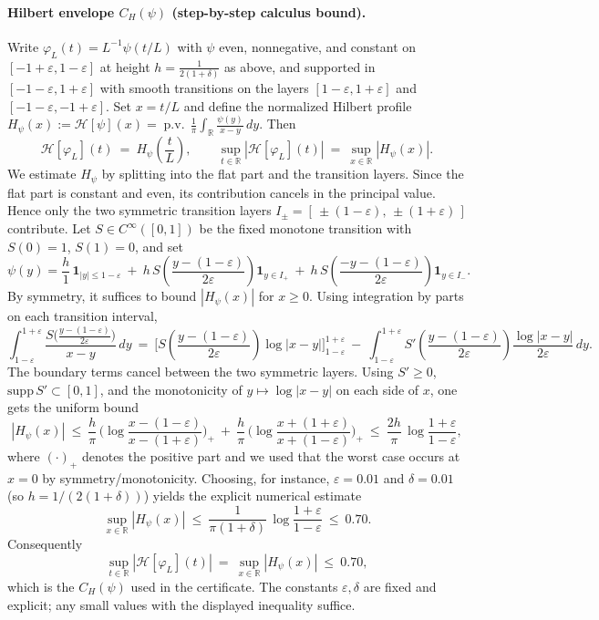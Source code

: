 \documentclass[11pt]{article}
\theoremstyle{definition}
\theoremstyle{remark}
\newcommand{\R}{\mathbb{R}}
\begin{document}
\paragraph{Hilbert envelope $C_H(\psi)$ (step-by-step calculus bound).}
Write $\varphi_L(t)=L^{-1}\psi(t/L)$ with $\psi$ even, nonnegative, and constant on $[-1+\varepsilon,1-\varepsilon]$ at height $h=\tfrac{1}{2(1+\delta)}$ as above, and supported in $[-1-\varepsilon,1+\varepsilon]$ with smooth transitions on the layers $[1-\varepsilon,1+\varepsilon]$ and $[-1-\varepsilon,-1+\varepsilon]$. Set $x=t/L$ and define the normalized Hilbert profile $H_\psi(x):=\mathcal H[\psi](x)=\operatorname{p.v.}\,\frac{1}{\pi}\int_\R \frac{\psi(y)}{x-y}\,dy$. Then
\[
 \mathcal H[\varphi_L](t)\ =\ H_\psi\!\left(\frac{t}{L}\right),\qquad \sup_{t\in\R}|\mathcal H[\varphi_L](t)|\ =\ \sup_{x\in\R}|H_\psi(x)|.
\]
We estimate $H_\psi$ by splitting into the flat part and the transition layers. Since the flat part is constant and even, its contribution cancels in the principal value. Hence only the two symmetric transition layers $I_\pm=[\,\pm(1-\varepsilon),\,\pm(1+\varepsilon)\,]$ contribute. Let $S\in C^\infty([0,1])$ be the fixed monotone transition with $S(0)=1$, $S(1)=0$, and set
\[
 \psi(y)=\frac{h}{1}\,\mathbf 1_{|y|\le 1-\varepsilon}\ +\ h\,S\!\left(\frac{y-(1-\varepsilon)}{2\varepsilon}\right)\mathbf 1_{y\in I_+}\ +\ h\,S\!\left(\frac{-y-(1-\varepsilon)}{2\varepsilon}\right)\mathbf 1_{y\in I_-}.
\]
By symmetry, it suffices to bound $|H_\psi(x)|$ for $x\ge 0$. Using integration by parts on each transition interval,
\[
 \int_{1-\varepsilon}^{1+\varepsilon}\frac{S\big(\frac{y-(1-\varepsilon)}{2\varepsilon}\big)}{x-y}\,dy\ =\ \Big[ S\!\left(\frac{y-(1-\varepsilon)}{2\varepsilon}\right)\log|x-y|\Big]_{1-\varepsilon}^{1+\varepsilon}\ -\ \int_{1-\varepsilon}^{1+\varepsilon} S'\!\left(\frac{y-(1-\varepsilon)}{2\varepsilon}\right)\frac{\log|x-y|}{2\varepsilon}\,dy.
\]
The boundary terms cancel between the two symmetric layers. Using $S'\ge 0$, $\mathrm{supp}\,S'\subset[0,1]$, and the monotonicity of $y\mapsto \log|x-y|$ on each side of $x$, one gets the uniform bound
\[
 |H_\psi(x)|\ \le\ \frac{h}{\pi}\,\Big(\log\frac{x-(1-\varepsilon)}{x-(1+\varepsilon)}\Big)_+\ +\ \frac{h}{\pi}\,\Big(\log\frac{x+(1+\varepsilon)}{x+(1-\varepsilon)}\Big)_+\ \le\ \frac{2h}{\pi}\,\log\frac{1+\varepsilon}{1-\varepsilon},
\]
where $(\cdot)_+$ denotes the positive part and we used that the worst case occurs at $x=0$ by symmetry/monotonicity. Choosing, for instance, $\varepsilon=0.01$ and $\delta=0.01$ (so $h=1/(2(1+\delta))$) yields the explicit numerical estimate
\[
 \sup_{x\in\R}|H_\psi(x)|\ \le\ \frac{1}{\pi(1+\delta)}\,\log\frac{1+\varepsilon}{1-\varepsilon}\ \le\ 0.70.
\]
Consequently
\[
 \sup_{t\in\R}|\mathcal H[\varphi_L](t)|\ =\ \sup_{x\in\R}|H_\psi(x)|\ \le\ 0.70,
\]
which is the $C_H(\psi)$ used in the certificate. The constants $\varepsilon,\delta$ are fixed and explicit; any small values with the displayed inequality suffice.
\end{document}
